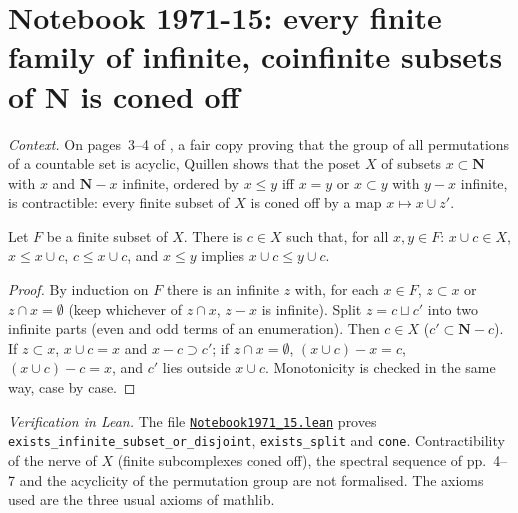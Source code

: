 \section[Notebook 1971-15: the poset of infinite coinfinite subsets is coned off]{Notebook 1971-15: every finite family of infinite, coinfinite subsets of $\mathbf N$ is coned off\protect{}}\label{sec:quillen-1971-15}

\emph{Context.} On pages~3--4 of , a fair copy proving that the group of all permutations of a countable set is acyclic, Quillen shows that the poset $X$ of subsets $x \subset \mathbf N$ with $x$ and $\mathbf N - x$ infinite, ordered by $x \le y$ iff $x = y$ or $x \subset y$ with $y - x$ infinite, is contractible: every finite subset of $X$ is coned off by a map $x \mapsto x \cup z'$.

\begin{encadre}
\begin{theoreme}\label{thm:quillen-1971-15}
Let $F$ be a finite subset of $X$. There is $c \in X$ such that, for all $x, y \in F$: $x \cup c \in X$, $x \le x \cup c$, $c \le x \cup c$, and $x \le y$ implies $x \cup c \le y \cup c$.
\end{theoreme}
\end{encadre}

\begin{proof}
By induction on $F$ there is an infinite $z$ with, for each $x \in F$, $z \subset x$ or $z \cap x = \emptyset$ (keep whichever of $z \cap x$, $z - x$ is infinite). Split $z = c \sqcup c'$ into two infinite parts (even and odd terms of an enumeration). Then $c \in X$ ($c' \subset \mathbf N - c$). If $z \subset x$, $x \cup c = x$ and $x - c \supset c'$; if $z \cap x = \emptyset$, $(x \cup c) - x = c$, $(x \cup c) - c = x$, and $c' $ lies outside $x \cup c$. Monotonicity is checked in the same way, case by case.
\end{proof}

\emph{Verification in Lean.} The file \href{\leanblobmain/Notebook1971_15.lean}{\texttt{Notebook1971\_15.\allowbreak{}lean}} proves \texttt{exists\_infinite\_subset\_or\_disjoint}, \texttt{exists\_split} and \texttt{cone}. Contractibility of the nerve of $X$ (finite subcomplexes coned off), the spectral sequence of pp.~4--7 and the acyclicity of the permutation group are not formalised. The axioms used are the three usual axioms of mathlib.

